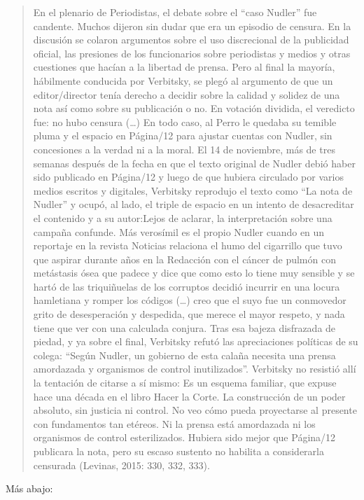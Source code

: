 {\begin{quote}
En el plenario de Periodistas, el debate sobre el ``caso Nudler'' fue candente. Muchos dijeron sin dudar que era un episodio de censura. En la discusión se colaron argumentos sobre el uso discrecional de la publicidad oficial, las presiones de los funcionarios sobre periodistas y medios y otras cuestiones que hacían a la libertad de prensa. Pero al final la mayoría, hábilmente conducida por Verbitsky, se plegó al argumento de que un editor/director tenía derecho a decidir sobre la calidad y solidez de una nota así como sobre su publicación o no. En votación dividida, el veredicto fue: no hubo censura (\ldots) En todo caso, al Perro le quedaba su temible pluma y el espacio en Página/12 para ajustar cuentas con Nudler, sin concesiones a la verdad ni a la moral. El 14 de noviembre, más de tres semanas después de la fecha en que el texto original de Nudler debió haber sido publicado en Página/12 y luego de que hubiera circulado por varios medios escritos y digitales, Verbitsky reprodujo el texto como ``La nota de Nudler'' y ocupó, al lado, el triple de espacio en un intento de desacreditar el contenido y a su autor:Lejos de aclarar, la interpretación sobre una campaña confunde. Más verosímil es el propio Nudler cuando en un reportaje en la revista Noticias relaciona el humo del cigarrillo que tuvo que aspirar durante años en la Redacción con el cáncer de pulmón con metástasis ósea que padece y dice que como esto lo tiene muy sensible y se hartó de las triquiñuelas de los corruptos decidió incurrir en una locura hamletiana y romper los códigos (\ldots) creo que el suyo fue un conmovedor grito de desesperación y despedida, que merece el mayor respeto, y nada tiene que ver con una calculada conjura. Tras esa bajeza disfrazada de piedad, y ya sobre el final, Verbitsky refutó las apreciaciones políticas de su colega: ``Según Nudler, un gobierno de esta calaña necesita una prensa amordazada y organismos de control inutilizados''. Verbitsky no resistió allí la tentación de citarse a sí mismo: Es un esquema familiar, que expuse hace una década en el libro Hacer la Corte. La construcción de un poder absoluto, sin justicia ni control. No veo cómo pueda proyectarse al presente con fundamentos tan etéreos. Ni la prensa está amordazada ni los organismos de control esterilizados. Hubiera sido mejor que Página/12 publicara la nota, pero su escaso sustento no habilita a considerarla censurada (Levinas, 2015: 330, 332, 333).
\end{quote}

Más abajo:

}
